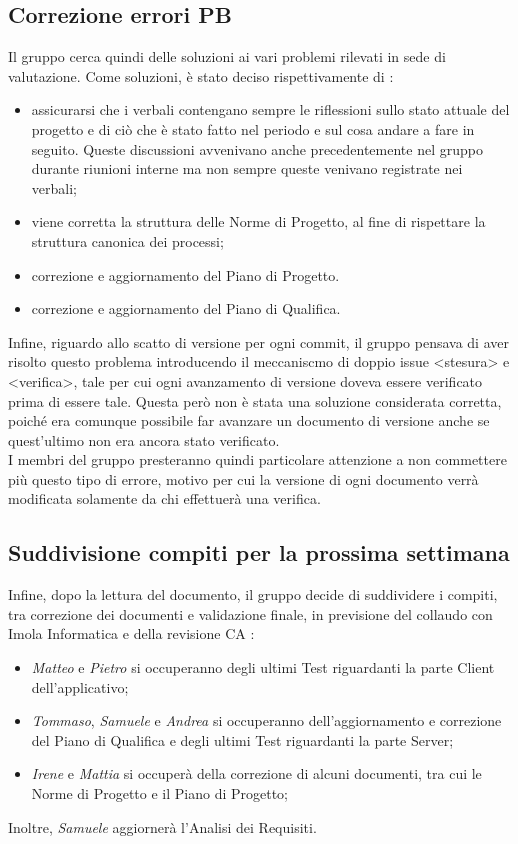 \subsection{Correzione errori PB}
Il gruppo cerca quindi delle soluzioni ai vari problemi rilevati in sede di valutazione. Come soluzioni, è stato deciso rispettivamente di :
\begin{itemize}
  \item assicurarsi che i verbali contengano sempre le riflessioni sullo stato attuale del progetto e di ciò che è stato fatto nel periodo e sul cosa andare a fare in seguito. 
  Queste discussioni avvenivano anche precedentemente nel gruppo durante riunioni interne ma non sempre queste venivano registrate nei verbali;
  \item viene corretta la struttura delle Norme di Progetto, al fine di rispettare la struttura canonica dei processi;
  \item correzione e aggiornamento del Piano di Progetto.
  \item correzione e aggiornamento del Piano di Qualifica.
\end{itemize}
Infine, riguardo allo scatto di versione per ogni commit, il gruppo pensava di aver risolto questo problema introducendo il meccaniscmo di doppio issue <stesura> e <verifica>, tale per cui ogni
avanzamento di versione doveva essere verificato prima di essere tale. Questa però non è stata una soluzione considerata corretta, poiché era comunque possibile far avanzare un documento di versione anche se 
quest'ultimo non era ancora stato verificato. \\
I membri del gruppo presteranno quindi particolare attenzione a non commettere più questo tipo di errore, motivo per cui la versione di ogni documento verrà modificata solamente da chi effettuerà una verifica. 


\subsection{Suddivisione compiti per la prossima settimana}
Infine, dopo la lettura del documento, il gruppo decide di suddividere i compiti, tra correzione dei documenti e validazione finale, in previsione del collaudo con Imola Informatica e della revisione CA :
\begin{itemize}
  \item \textit{Matteo} e \textit{Pietro} si occuperanno degli ultimi Test riguardanti la parte Client \\ dell'applicativo;
  \item \textit{Tommaso}, \textit{Samuele} e \textit{Andrea} si occuperanno dell'aggiornamento e correzione del Piano di Qualifica e degli ultimi Test riguardanti la parte Server;
  \item \textit{Irene} e \textit{Mattia} si occuperà della correzione di alcuni documenti, tra cui le Norme di Progetto e il Piano di Progetto;
\end{itemize}
Inoltre, \textit{Samuele} aggiornerà l'Analisi dei Requisiti.
